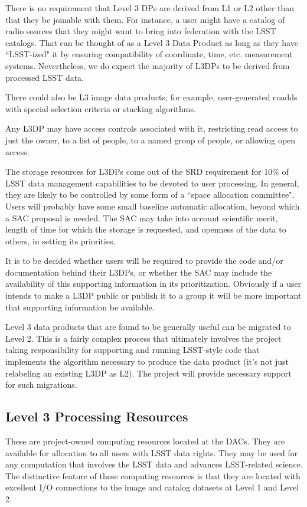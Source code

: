 \documentclass[12pt]{article}
\begin{document}
There is no requirement that Level 3 DPs are derived from L1 or L2 other than that they be joinable with them.  For instance, a user might have a catalog of radio sources that they might want to bring into federation with the LSST catalogs. That can be thought of as a Level 3 Data Product as long as they have ``LSST-ized" it by ensuring compatibility of coordinate, time, etc. measurement systems.  Nevertheless, we do expect the majority of L3DPs to be derived from processed LSST data.

There could also be L3 image data products; for example, user-generated coadds with special selection criteria or stacking algorithms.

Any L3DP may have access controls associated with it, restricting read access to just the owner, to a list of people, to a named group of people, or allowing open access.

The storage resources for L3DPs come out of the SRD requirement for 10\% of LSST data management capabilities to be devoted to user processing. In general, they are likely to be controlled by some form of a ``space allocation committee".  Users will probably have some small baseline automatic allocation, beyond which a SAC proposal is needed. The SAC may take into account scientific merit, length of time for which the storage is requested, and openness of the data to others, in setting its priorities.

It is to be decided whether users will be required to provide the code and/or documentation behind their L3DPs, or whether the SAC may include the availability of this supporting information in its prioritization.  Obviously if a user intends to make a L3DP public or publish it to a group it will be more important that supporting information be available.

Level 3 data products that are found to be generally useful can be migrated to Level 2.
This is a fairly complex process that ultimately involves the project taking responsibility for supporting and running LSST-style code that implements the algorithm necessary to produce the data product (it's not just relabeling an existing L3DP as L2).  The project will provide necessary support for such migrations.

\subsection{Level 3 Processing Resources}

These are project-owned computing resources located at the DACs.  They are available for allocation to all users with LSST data rights.  They may be used for any computation that involves the LSST data and advances LSST-related science. The distinctive feature of these computing resources is that they are located with excellent I/O connections to the image and catalog datasets at Level 1 and Level 2.
\end{document}
